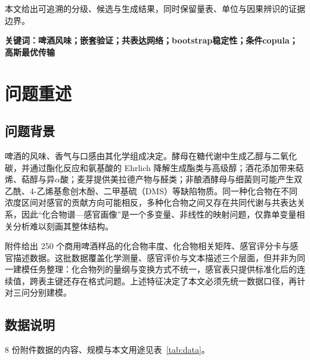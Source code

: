 \documentclass[UTF8,a4paper,zihao=-4]{ctexart}
\numberwithin{figure}{section}
\numberwithin{table}{section}
\numberwithin{equation}{section}
\begin{document}
本文给出可追溯的分级、候选与生成结果，同时保留量表、单位与因果辨识的证据边界。

\vspace{0.3em}
\noindent\textbf{关键词：啤酒风味；嵌套验证；共表达网络；bootstrap稳定性；条件copula；高斯最优传输}
\newpage
\pagestyle{empty}
\tableofcontents  


\newpage
\pagestyle{fancy}
\setcounter{page}{1}

\section{问题重述}
\label{sec:problem}

\subsection{问题背景}

啤酒的风味、香气与口感由其化学组成决定\cite{liu2023}。酵母在糖代谢中生成乙醇与二氧化碳，并通过酯化反应和氨基酸的 Ehrlich 降解生成酯类与高级醇；酒花添加带来萜烯、萜醇与异$\alpha$酸\cite{lijj2025}；麦芽提供美拉德产物与醛类；非酿酒酵母与细菌则可能产生双乙酰、4-乙烯基愈创木酚、二甲基硫（DMS）等缺陷物质\cite{vanderhaegen2006}。同一种化合物在不同浓度区间对感官的贡献方向可能相反，多种化合物之间又存在共同代谢与共表达关系，因此“化合物谱—感官画像”是一个多变量、非线性的映射问题，仅靠单变量相关分析难以刻画其整体结构。

附件给出 250 个商用啤酒样品\cite{schreurs2024}的化合物丰度、化合物相关矩阵、感官评分卡与感官描述数据。这批数据覆盖化学测量、感官评价与文本描述三个层面，但并非为同一建模任务整理：化合物列的量纲与变换方式不统一，感官表只提供标准化后的连续值，跨表主键还存在格式问题。上述特征决定了本文必须先统一数据口径，再针对三问分别建模。

\subsection{数据说明}

8 份附件数据的内容、规模与本文用途见表~\ref{tab:data}。
\end{document}
